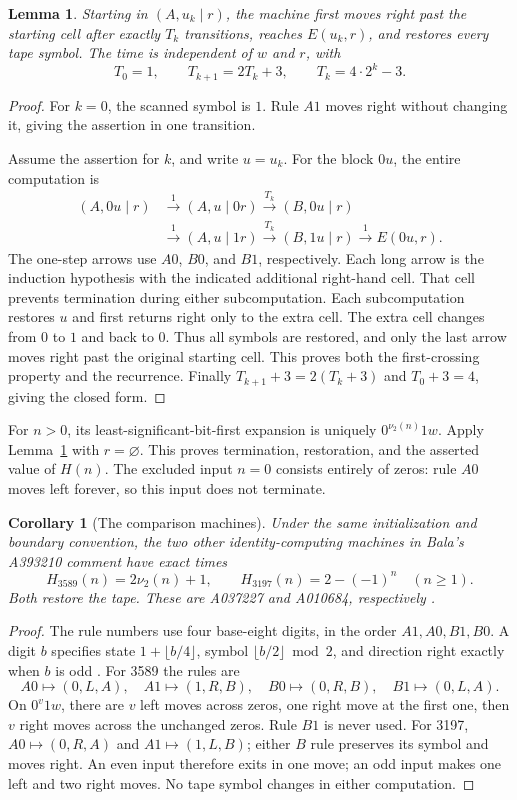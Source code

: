 \documentclass[11pt]{article}
\newtheorem{lemma}{Lemma}
\newtheorem{corollary}{Corollary}
\newcommand{\val}{\nu_2}
\begin{document}
\begin{lemma}\label{lem:block}
Starting in $(A,u_k\mid r)$, the machine first moves right past the starting
cell after exactly $T_k$ transitions, reaches $E(u_k,r)$, and restores every
tape symbol. The time is independent of $w$ and $r$, with
\[
 T_0=1,\qquad T_{k+1}=2T_k+3,\qquad T_k=4\cdot2^k-3.
\]
\end{lemma}
\begin{proof}
For $k=0$, the scanned symbol is $1$. Rule $A1$ moves right without changing
it, giving the assertion in one transition.

Assume the assertion for $k$, and write $u=u_k$. For the block $0u$, the
entire computation is
\[
\begin{aligned}
(A,0u\mid r)&\xrightarrow{1}(A,u\mid0r)
\xrightarrow{T_k}(B,0u\mid r)\\
&\xrightarrow{1}(A,u\mid1r)
\xrightarrow{T_k}(B,1u\mid r)
\xrightarrow{1}E(0u,r).
\end{aligned}
\]
The one-step arrows use $A0$, $B0$, and $B1$, respectively. Each long arrow
is the induction hypothesis with the indicated additional right-hand cell.
That cell prevents termination during either subcomputation. Each
subcomputation restores $u$ and first returns right only to the extra cell.
The extra cell changes from $0$ to $1$ and back to $0$. Thus all symbols are
restored, and only the last arrow moves right past the original starting
cell. This proves both the first-crossing property and the recurrence.
Finally $T_{k+1}+3=2(T_k+3)$ and $T_0+3=4$, giving the closed form.
\end{proof}

For $n>0$, its least-significant-bit-first expansion is uniquely
$0^{\val(n)}1w$. Apply Lemma~\ref{lem:block} with $r=\varnothing$.
This proves termination, restoration, and the asserted value of $H(n)$.
The excluded input $n=0$ consists entirely of zeros: rule $A0$ moves left
forever, so this input does not terminate.

\begin{corollary}[The comparison machines]\label{cor:machines}
Under the same initialization and boundary convention, the two other
identity-computing machines in Bala's A393210 comment have exact times
\[
 H_{3589}(n)=2\val(n)+1,\qquad
 H_{3197}(n)=2-(-1)^n\quad(n\geq1).
\]
Both restore the tape. These are A037227 and A010684, respectively
\cite{comparisons}.
\end{corollary}
\begin{proof}
The rule numbers use four base-eight digits, in the order $A1,A0,B1,B0$.
A digit $b$ specifies state $1+\lfloor b/4\rfloor$, symbol
$\lfloor b/2\rfloor\bmod2$, and direction right exactly when $b$ is odd
\cite{decoder}. For 3589 the rules are
\[
 A0\mapsto(0,L,A),\quad A1\mapsto(1,R,B),\quad
 B0\mapsto(0,R,B),\quad B1\mapsto(0,L,A).
\]
On $0^v1w$, there are $v$ left moves across zeros, one right move at the
first one, then $v$ right moves across the unchanged zeros. Rule $B1$
is never used. For 3197, $A0\mapsto(0,R,A)$ and
$A1\mapsto(1,L,B)$; either $B$ rule preserves its symbol and moves right.
An even input therefore exits in one move; an odd input makes one left
and two right moves. No tape symbol changes in either computation.
\end{proof}
\end{document}
